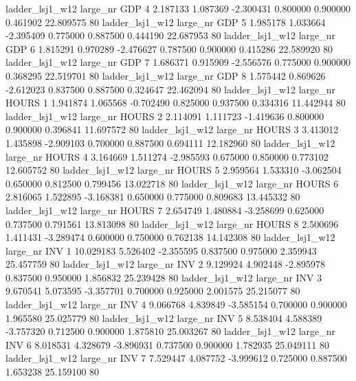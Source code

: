     ladder_lsj1_w12   large_nr      GDP                 4  2.187133  1.087369  -2.300431 0.800000 0.900000  0.461902   22.809575 80
    ladder_lsj1_w12   large_nr      GDP                 5  1.985178  1.033664  -2.395409 0.775000 0.887500  0.444190   22.687953 80
    ladder_lsj1_w12   large_nr      GDP                 6  1.815291  0.970289  -2.476627 0.787500 0.900000  0.415286   22.589920 80
    ladder_lsj1_w12   large_nr      GDP                 7  1.686371  0.915909  -2.556576 0.775000 0.900000  0.368295   22.519701 80
    ladder_lsj1_w12   large_nr      GDP                 8  1.575442  0.869626  -2.612023 0.837500 0.887500  0.324647   22.462094 80
    ladder_lsj1_w12   large_nr    HOURS                 1  1.941874  1.065568  -0.702490 0.825000 0.937500  0.334316   11.442944 80
    ladder_lsj1_w12   large_nr    HOURS                 2  2.114091  1.111723  -1.419636 0.800000 0.900000  0.396841   11.697572 80
    ladder_lsj1_w12   large_nr    HOURS                 3  3.413012  1.435898  -2.909103 0.700000 0.887500  0.694111   12.182960 80
    ladder_lsj1_w12   large_nr    HOURS                 4  3.164669  1.511274  -2.985593 0.675000 0.850000  0.773102   12.605752 80
    ladder_lsj1_w12   large_nr    HOURS                 5  2.959564  1.533310  -3.062504 0.650000 0.812500  0.799456   13.022718 80
    ladder_lsj1_w12   large_nr    HOURS                 6  2.816065  1.522895  -3.168381 0.650000 0.775000  0.809683   13.445332 80
    ladder_lsj1_w12   large_nr    HOURS                 7  2.654749  1.480884  -3.258699 0.625000 0.737500  0.791561   13.813098 80
    ladder_lsj1_w12   large_nr    HOURS                 8  2.500696  1.411431  -3.289474 0.600000 0.750000  0.762138   14.142308 80
    ladder_lsj1_w12   large_nr      INV                 1 10.029183  5.526402  -2.355595 0.837500 0.975000  2.359943   25.457759 80
    ladder_lsj1_w12   large_nr      INV                 2  9.129924  4.902448  -2.895978 0.837500 0.950000  1.856832   25.239428 80
    ladder_lsj1_w12   large_nr      INV                 3  9.670541  5.073595  -3.357701 0.700000 0.925000  2.001575   25.215077 80
    ladder_lsj1_w12   large_nr      INV                 4  9.066768  4.839849  -3.585154 0.700000 0.900000  1.965580   25.025779 80
    ladder_lsj1_w12   large_nr      INV                 5  8.538404  4.588389  -3.757320 0.712500 0.900000  1.875810   25.003267 80
    ladder_lsj1_w12   large_nr      INV                 6  8.018531  4.328679  -3.896931 0.737500 0.900000  1.782935   25.049111 80
    ladder_lsj1_w12   large_nr      INV                 7  7.529447  4.087752  -3.999612 0.725000 0.887500  1.653238   25.159100 80
